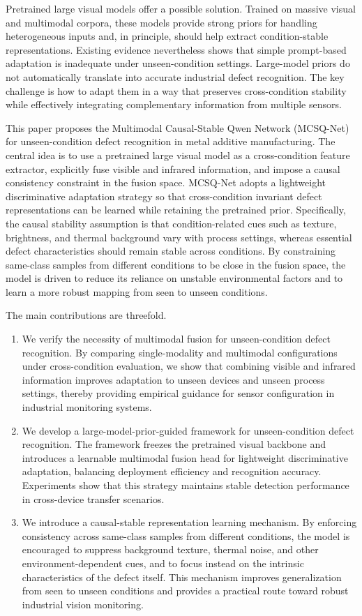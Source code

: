 \documentclass[journal]{IEEEtran}
\begin{document}
Pretrained large visual models offer a possible solution. Trained on massive visual and multimodal corpora, these models provide strong priors for handling heterogeneous inputs and, in principle, should help extract condition-stable representations. Existing evidence nevertheless shows that simple prompt-based adaptation is inadequate under unseen-condition settings. Large-model priors do not automatically translate into accurate industrial defect recognition. The key challenge is how to adapt them in a way that preserves cross-condition stability while effectively integrating complementary information from multiple sensors.

This paper proposes the Multimodal Causal-Stable Qwen Network (MCSQ-Net) for unseen-condition defect recognition in metal additive manufacturing. The central idea is to use a pretrained large visual model as a cross-condition feature extractor, explicitly fuse visible and infrared information, and impose a causal consistency constraint in the fusion space. MCSQ-Net adopts a lightweight discriminative adaptation strategy so that cross-condition invariant defect representations can be learned while retaining the pretrained prior. Specifically, the causal stability assumption is that condition-related cues such as texture, brightness, and thermal background vary with process settings, whereas essential defect characteristics should remain stable across conditions. By constraining same-class samples from different conditions to be close in the fusion space, the model is driven to reduce its reliance on unstable environmental factors and to learn a more robust mapping from seen to unseen conditions.

The main contributions are threefold.
\begin{enumerate}
\item We verify the necessity of multimodal fusion for unseen-condition defect recognition. By comparing single-modality and multimodal configurations under cross-condition evaluation, we show that combining visible and infrared information improves adaptation to unseen devices and unseen process settings, thereby providing empirical guidance for sensor configuration in industrial monitoring systems.
\item We develop a large-model-prior-guided framework for unseen-condition defect recognition. The framework freezes the pretrained visual backbone and introduces a learnable multimodal fusion head for lightweight discriminative adaptation, balancing deployment efficiency and recognition accuracy. Experiments show that this strategy maintains stable detection performance in cross-device transfer scenarios.
\item We introduce a causal-stable representation learning mechanism. By enforcing consistency across same-class samples from different conditions, the model is encouraged to suppress background texture, thermal noise, and other environment-dependent cues, and to focus instead on the intrinsic characteristics of the defect itself. This mechanism improves generalization from seen to unseen conditions and provides a practical route toward robust industrial vision monitoring.
\end{enumerate}
\end{document}
